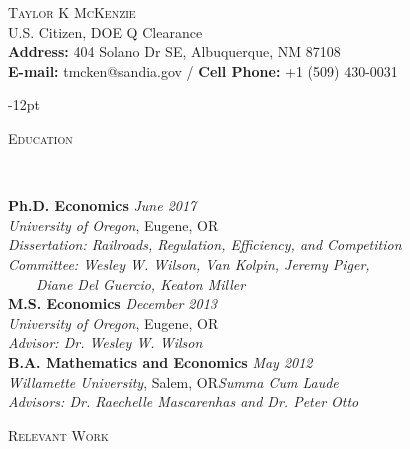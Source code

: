\documentclass[11pt]{article}
\newenvironment{changemargin}[2]{%
  \begin{list}{}{%
    \setlength{\topsep}{0pt}%
    \setlength{\leftmargin}{#1}%
    \setlength{\rightmargin}{#2}%
    \setlength{\listparindent}{\parindent}%
    \setlength{\itemindent}{\parindent}%
    \setlength{\parsep}{\parskip}%
  }%
  \item[]}{\end{list}
}
\newcommand{\lineover}{
	\begin{changemargin}{-0.05in}{-0.05in}
		\vspace*{-8pt}
		\hrulefill \\
		\vspace*{-2pt}
	\end{changemargin}
}
\newcommand{\header}[1]{
	\begin{changemargin}{-0.5in}{-0.5in}
		\scshape{#1}\\
  	\lineover
	\end{changemargin}
}
\newcommand{\contact}[4]{
	\begin{changemargin}{-0.5in}{-0.5in}
		\begin{center}
			{\Large \scshape {#1}}\\ \smallskip
			{#2}\\ \smallskip 
			{#3}\\ \smallskip
			{#4}\smallskip
		\end{center}
	\end{changemargin}
}
\newenvironment{body} {
	\vspace*{-16pt}
	\begin{changemargin}{-0.25in}{-0.5in}
  }	
	{\end{changemargin}
}
\begin{document}



\contact{\vspace*{-5ex}Taylor K McKenzie}{U.S. Citizen, DOE Q Clearance\\ \textbf{Address:} 404 Solano Dr SE, Albuquerque, NM 87108}{\vspace*{-0.75ex}\textbf{E-mail:} tmcken@sandia.gov / \textbf{Cell Phone:} +1 (509) 430-0031}

\vspace{-12pt}
\header{Education}

\begin{body}
	\vspace{14pt}
	\textbf{Ph.D. Economics}{} \hfill \emph{June 2017}{} \\
	\emph{University of Oregon}, Eugene, OR{}\\
	\emph{Dissertation: Railroads, Regulation, Efficiency, and Competition}\\
	\emph{Committee: Wesley W. Wilson, Van Kolpin, Jeremy Piger,}\\
	\ \ \ \ \emph{Diane Del Guercio, Keaton Miller}\\
	\vspace*{0pt}
  \medskip
	\textbf{M.S. Economics}{} \hfill \emph{December 2013}{} \\
	\emph{University of Oregon}, Eugene, OR{}\\
	\emph{Advisor: Dr. Wesley W. Wilson} \\
	\vspace*{0pt}
  \medskip
  	\textbf{B.A. Mathematics and Economics}{} \hfill \emph{May 2012}{} \\
	\emph{Willamette University}, Salem, OR{}\hfill \emph{Summa Cum Laude}{}\\
	\emph{Advisors: Dr. Raechelle Mascarenhas and Dr. Peter Otto} {} \hfill\\
\end{body}
\smallskip
\header{Relevant Work}
\end{document}
